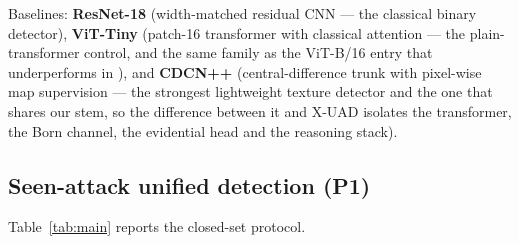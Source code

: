 \documentclass[conference]{IEEEtran}
\begin{document}
Baselines: \textbf{ResNet-18} (width-matched residual CNN --- the classical binary
detector), \textbf{ViT-Tiny} (patch-16 transformer with classical attention --- the
plain-transformer control, and the same family as the ViT-B/16 entry that
underperforms in \cite{yu2024unified}), and \textbf{CDCN++} (central-difference
trunk with pixel-wise map supervision \cite{yu2020cdcn,yu2021revisiting} --- the
strongest lightweight texture detector and the one that shares our stem, so the
difference between it and X-UAD isolates the transformer, the Born channel, the
evidential head and the reasoning stack).

\subsection{Seen-attack unified detection (P1)}
Table~\ref{tab:main} reports the closed-set protocol.

\begin{table}[t]
\centering
\caption{Protocol P1 (seen attacks, identity-disjoint, ID-consistent). ACC$_8$ is
$8$-way family accuracy; all others follow ISO/IEC 30107-3 \cite{iso30107}.
Best per column in bold.}
\label{tab:main}
\footnotesize
\resizebox{\linewidth}{!}{}
\end{table}
\end{document}
